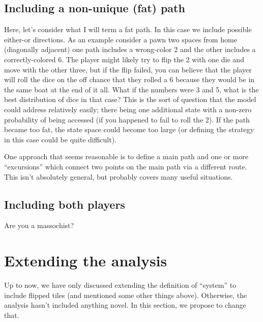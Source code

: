 \documentclass[letterpaper,11pt]{article}
\begin{document}
\subsection{Including a non-unique (fat) path}
Here, let's consider what I will term a fat path.  In this case we include
possible either-or directions.  As an example consider a pawn two spaces from
home (diagonally adjacent) one path includes a wrong-color 2 and the other
includes a correctly-colored 6.  The player might likely try to flip the 2 with
one die and move with the other three, but if the flip failed, you can believe
that the player will roll the dice on the off chance that they rolled a 6
because they would be in the same boat at the end of it all.  What if the
numbers were 3 and 5, what is the best distribution of dice in that case?
This is the sort of question that the model could address relatively easily;
there being one additional state with a non-zero probability of being accessed
(if you happened to fail to roll the 2).  If the path became too fat, the state
space could become too large (or defining the strategy in this case could be
quite difficult).

One approach that seems reasonable is to define a main path and one or more
``excursions'' which connect two points on the main path via a different route.
This isn't absolutely general, but probably covers many useful situations.

\subsection{Including both players}
Are you a massochist?

\section{Extending the analysis}
Up to now, we have only discussed extending the definition of ``system'' to 
include flipped tiles (and mentioned some other things above).  Otherwise, the
analysis hasn't included anything novel.  In this section, we propose to change
that.  
\end{document}
